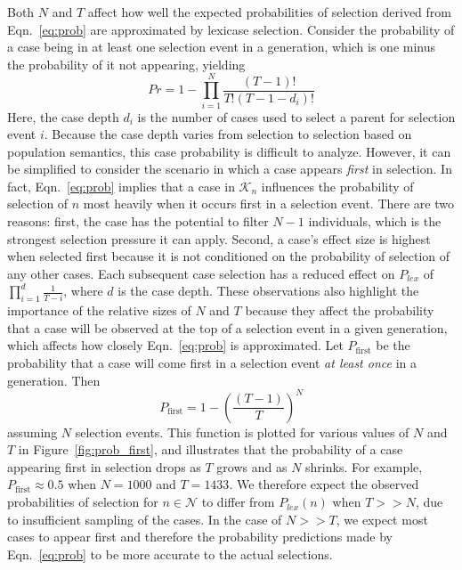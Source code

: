 \documentclass[twoside]{article}
\begin{document}
Both $N$ and $T$ affect how well the expected probabilities of selection derived from Eqn.~\ref{eq:prob} are approximated by lexicase selection. Consider the probability of a case being in at least one selection event in a generation, which is one minus the probability of it not appearing, yielding
\[Pr= 1 - \prod_{i=1}^N{\frac{(T-1)!}{T!(T-1-d_i)!}} \]
Here, the case depth $d_i$ is the number of cases used to select a parent for selection event $i$. Because the case depth varies from selection to selection based on population semantics, this case probability is difficult to analyze. However, it can be simplified to consider the scenario in which a case appears {\it first} in selection. In fact, Eqn.~\ref{eq:prob} implies that a case in $\mathcal{K}_n$ influences the probability of selection of $n$ most heavily when it occurs first in a selection event. There are two reasons: first, the case has the potential to filter $N-1$ individuals, which is the strongest selection pressure it can apply. Second, a case's effect size is highest when selected first because it is not conditioned on the probability of selection of any other cases. Each subsequent case selection has a reduced effect on $P_{lex}$ of $\prod_{i=1}^d{\frac{1}{T-i}}$, where $d$ is the case depth. These observations also highlight the importance of the relative sizes of $N$ and $T$ because they affect the probability that a case will be observed at the top of a selection event in a given generation, which affects how closely Eqn.~\ref{eq:prob} is approximated. Let $P_{\text{first}}$ be the probability that a case will come first in a selection event {\it at least once} in a generation. Then
\begin{equation}\label{eq:prob_case}
P_{\text{first}} = 1 - \left(\frac{(T-1)}{T}\right)^N
\end{equation}
assuming $N$ selection events. This function is plotted for various values of $N$ and $T$ in Figure~\ref{fig:prob_first}, and illustrates that the probability of a case appearing first in selection drops as $T$ grows and as $N$ shrinks. For example, $P_{\text{first}} \approx 0.5$ when $N=1000$ and $T=1433$. We therefore expect the observed probabilities of selection for $n \in \mathcal{N}$ to differ from $P_{lex}(n)$ when $T >> N$, due to insufficient sampling of the cases. In the case of $N >> T$, we expect most cases to appear first and therefore the probability predictions made by Eqn.~\ref{eq:prob} to be more accurate to the actual selections. 
\end{document}
